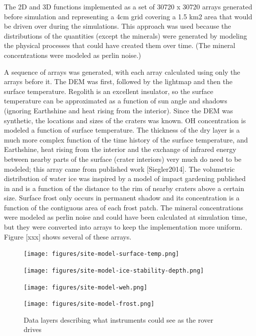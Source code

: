 \documentclass[twocolumn,letterpaper]{IEEEAerospaceCLS}  %
\begin{document}
The 2D and 3D functions implemented as a set of 30720 x 30720 arrays generated before simulation and representing a 4cm grid covering a 1.5 km2 area that would be driven over during the simulations.  
This approach was used because the distributions of the quantities (except the minerals) were generated by modeling the physical processes that could have created them over time.  
(The mineral concentrations were modeled as perlin noise.)

A sequence of arrays was generated, with each array calculated using only the arrays before it.  
The DEM was first, followed by the lightmap and then the surface temperature.  
Regolith is an excellent insulator, so the surface temperature can be approximated as a function of sun angle and shadows (ignoring Earthshine and heat rising from the interior).  
Since the DEM was synthetic, the locations and sizes of the craters was known.  
OH concentration is modeled a function of surface temperature.  
The thickness of the dry layer is a much more complex function of the time history of the surface temperature, and Earthshine, heat rising from the interior and the exchange of infrared energy between nearby parts of the surface (crater interiors) very much do need to be modeled; this array came from published work [Siegler2014].  
The volumetric distribution of water ice was inspired by a model of impact gardening published in \cite{hurley2012} and is a function of the distance to the rim of nearby craters above a certain size.  
Surface frost only occurs in permanent shadow and its concentration is a function of the contiguous area of each frost patch.  
The mineral concentrations were modeled as perlin noise and could have been calculated at simulation time, but they were converted into arrays to keep the implementation more uniform.  
Figure [xxx] shows several of these arrays.

\begin{figure}[htp]
\begin{subfloat}{
\texttt{[image: figures/site-model-surface-temp.png]}
}
\end{subfloat}
\qquad
\begin{subfloat}{
\texttt{[image: figures/site-model-ice-stability-depth.png]}
}
\end{subfloat}
\qquad
\begin{subfloat}{
\texttt{[image: figures/site-model-weh.png]}
}
\end{subfloat}
\qquad
\begin{subfloat}{
\texttt{[image: figures/site-model-frost.png]}
}
\end{subfloat}
\caption{Data layers describing what instruments could see as the rover drives\label{fig:sim-by-real}}
\end{figure}
\end{document}
